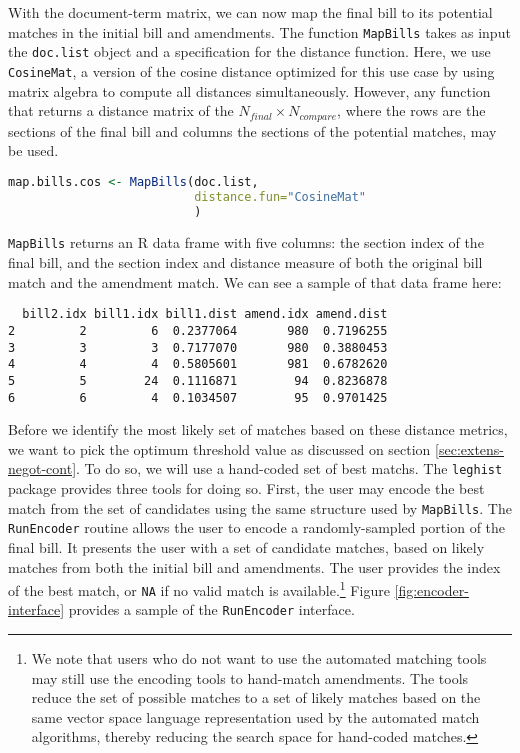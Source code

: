 \documentclass[11pt]{article}
\begin{document}
With the document-term matrix, we can now map the final bill to its
potential matches in the initial bill and amendments. The function
\texttt{MapBills} takes as input the \texttt{doc.list} object and a
specification for the distance function. Here, we use
\texttt{CosineMat}, a version of the cosine distance
optimized for this use case by using matrix algebra to compute all
distances simultaneously. However, any function that returns a
distance matrix of the $N_{final} \times N_{compare}$, where the rows
are the sections of the final bill and columns the sections of the
potential matches, may be used. 

\begin{lstlisting}[language=R, numbers=none]
map.bills.cos <- MapBills(doc.list,
                          distance.fun="CosineMat"
                          )
\end{lstlisting}

\texttt{MapBills} returns an R data frame with five columns: the
section index of the final bill, and the section index and distance
measure of both the original bill match and the amendment match. We
can see a sample of that data frame here:

\begin{verbatim}
  bill2.idx bill1.idx bill1.dist amend.idx amend.dist
2         2         6  0.2377064       980  0.7196255
3         3         3  0.7177070       980  0.3880453
4         4         4  0.5805601       981  0.6782620
5         5        24  0.1116871        94  0.8236878
6         6         4  0.1034507        95  0.9701425
\end{verbatim}

Before we identify the most likely set of matches based on these
distance metrics, we want to pick the optimum threshold value as
discussed on section \ref{sec:extens-negot-cont}. To do so, we will
use a hand-coded set of best matchs. The \texttt{leghist} package
provides three tools for doing so. First, the user may encode the best
match from the set of candidates using the same structure used by
\texttt{MapBills}. The \texttt{RunEncoder} routine allows the user to
encode a randomly-sampled portion of the final bill. It presents the
user with a set of candidate matches, based on likely matches from
both the initial bill and amendments. The user provides the index of
the best match, or \texttt{NA} if no valid match is
available.\footnote{We note that users who do not want to use the
  automated matching tools may still use the encoding tools to
  hand-match amendments. The tools reduce the set of possible matches
  to a set of likely matches based on the same vector space language
  representation used by the automated match algorithms, thereby
  reducing the search space for hand-coded matches.} Figure
\ref{fig:encoder-interface} provides a sample of the 
\texttt{RunEncoder} interface.
\end{document}
